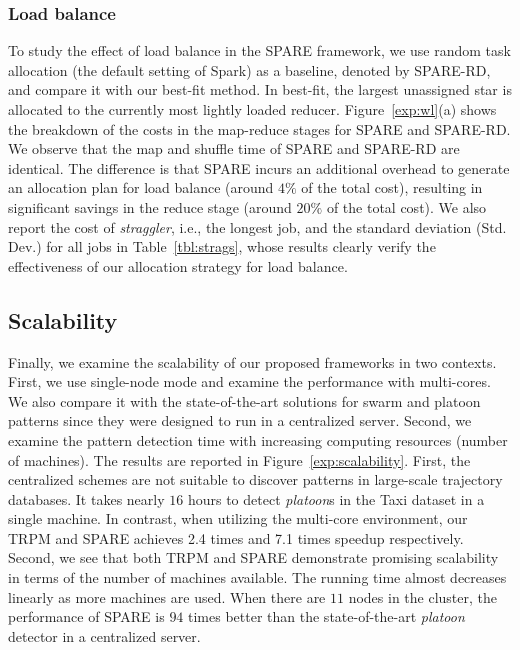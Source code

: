\subsubsection{Load balance}
To study the effect of load balance in the SPARE framework, we use random task allocation (the default setting of Spark) as a baseline, denoted by SPARE-RD, and compare it with our best-fit method. In best-fit, the largest unassigned star is allocated to the currently most lightly loaded reducer.
Figure~\ref{exp:wl}(a) shows the breakdown of the costs in the map-reduce stages for SPARE and SPARE-RD. We observe that the map and shuffle time of SPARE and SPARE-RD are identical. The difference is that SPARE incurs an additional overhead to generate an allocation plan for load balance (around $4\%$ of the total cost), resulting in significant savings in the reduce stage (around $20\%$ of the total cost). We also report the cost of \emph{straggler}, i.e., the longest job, and the standard deviation (Std. Dev.) for all jobs in Table~\ref{tbl:strags}, whose results clearly verify the effectiveness of our allocation strategy for load balance.

\subsection{Scalability}
Finally, we examine the scalability of our proposed frameworks in two contexts. First, we use single-node mode and examine the performance with multi-cores. We also compare it with the  state-of-the-art solutions for swarm and platoon patterns since they were designed  to run in a centralized server. Second, we examine the pattern detection time with increasing computing resources (number of machines). The results are reported in Figure~\ref{exp:scalability}. First, the centralized schemes are not suitable to discover patterns in large-scale trajectory databases. It takes nearly $16$ hours to detect \emph{platoon}s in the Taxi dataset in a single machine. In contrast, when utilizing the multi-core environment, our TRPM and SPARE achieves 2.4 times and 7.1 times speedup respectively. Second, we see that both TRPM and SPARE demonstrate promising scalability in terms of the number of machines available. The running time almost decreases linearly as more machines are used. When there are $11$ nodes in the cluster, the performance of SPARE is $94$ times better than the state-of-the-art \emph{platoon} detector in a centralized server.

